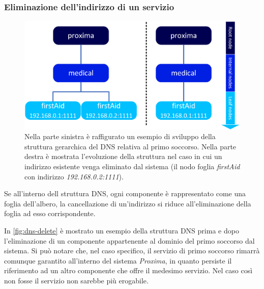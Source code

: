 \documentclass[a4paper,12pt]{report}
\begin{document}
\subsubsection{Eliminazione dell'indirizzo di un servizio}
\begin{figure}[H]
	\centering
	\includegraphics[scale=0.7]{./img/dns-delete.png}
	\caption{Nella parte sinistra è raffigurato un esempio di sviluppo della struttura gerarchica del DNS relativa al primo soccorso. Nella parte destra è mostrata l'evoluzione della struttura nel caso in cui un indirizzo esistente venga eliminato dal sistema (il nodo foglia \emph{firstAid} con indirizzo \emph{192.168.0.2:1111}). }
	\label{fig:dns-delete}
\end{figure}
Se all'interno dell struttura DNS, ogni componente è rappresentato come una foglia dell'albero, la cancellazione di un'indirizzo si riduce all'eliminazione della foglia ad esso corrispondente. 

In \autoref{fig:dns-delete} è mostrato un esempio della struttura DNS prima e dopo l'eliminazione di un componente appartenente al dominio del primo soccorso dal sistema. Si può notare che, nel caso specifico, il servizio di primo soccorso rimarrà comunque garantito all'interno del sistema \emph{Proxima}, in quanto persiste il riferimento ad un altro componente che offre il medesimo servizio. Nel caso così non fosse il servizio non sarebbe più erogabile.
\end{document}
